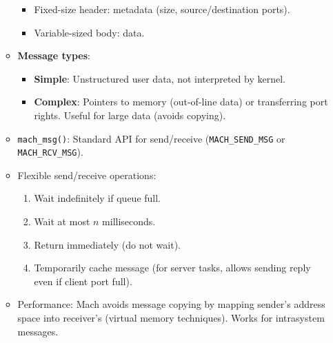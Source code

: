 \begin{itemize}
\begin{itemize}
                \begin{itemize}
                    \item Fixed-size header: metadata (size, source/destination ports).
                    \item Variable-sized body: data.
                \end{itemize}
            \item \textbf{Message types}:
                \begin{itemize}
                    \item \textbf{Simple}: Unstructured user data, not interpreted by kernel.
                    \item \textbf{Complex}: Pointers to memory (out-of-line data) or transferring port rights. Useful for large data (avoids copying).
                \end{itemize}
            \item \texttt{mach\_msg()}: Standard API for send/receive (\texttt{MACH\_SEND\_MSG} or \texttt{MACH\_RCV\_MSG}).
            \item Flexible send/receive operations:
                \begin{enumerate}
                    \item Wait indefinitely if queue full.
                    \item Wait at most $n$ milliseconds.
                    \item Return immediately (do not wait).
                    \item Temporarily cache message (for server tasks, allows sending reply even if client port full).
                \end{enumerate}
            \item Performance: Mach avoids message copying by mapping sender's address space into receiver's (virtual memory techniques). Works for intrasystem messages.
        \end{itemize}
\end{itemize}

